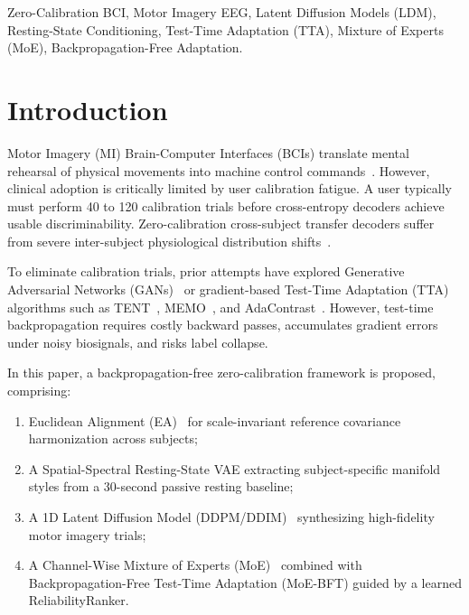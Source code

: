\documentclass[journal,10pt]{IEEEtran}
\begin{document}
\begin{IEEEkeywords}
Zero-Calibration BCI, Motor Imagery EEG, Latent Diffusion Models (LDM), Resting-State Conditioning, Test-Time Adaptation (TTA), Mixture of Experts (MoE), Backpropagation-Free Adaptation.
\end{IEEEkeywords}

\section{Introduction}
Motor Imagery (MI) Brain-Computer Interfaces (BCIs) translate mental rehearsal of physical movements into machine control commands~\cite{lotte2018review, saha2020progress}. However, clinical adoption is critically limited by user calibration fatigue. A user typically must perform 40 to 120 calibration trials before cross-entropy decoders achieve usable discriminability. Zero-calibration cross-subject transfer decoders suffer from severe inter-subject physiological distribution shifts~\cite{lawhern2018eegnet, altaheri2022physics}.

To eliminate calibration trials, prior attempts have explored Generative Adversarial Networks (GANs)~\cite{saha2020progress} or gradient-based Test-Time Adaptation (TTA) algorithms such as TENT~\cite{wang2020tent}, MEMO~\cite{zhang2022memo}, and AdaContrast~\cite{chen2022contrastive}. However, test-time backpropagation requires costly backward passes, accumulates gradient errors under noisy biosignals, and risks label collapse.

In this paper, a backpropagation-free zero-calibration framework is proposed, comprising:
\begin{enumerate}
    \item Euclidean Alignment (EA)~\cite{he2020transfer} for scale-invariant reference covariance harmonization across subjects;
    \item A Spatial-Spectral Resting-State VAE extracting subject-specific manifold styles from a 30-second passive resting baseline;
    \item A 1D Latent Diffusion Model (DDPM/DDIM)~\cite{ho2020denoising, song2020denoising, rombach2022high} synthesizing high-fidelity motor imagery trials;
    \item A Channel-Wise Mixture of Experts (MoE)~\cite{shazeer2017outrageously, fedus2022switch} combined with Backpropagation-Free Test-Time Adaptation (MoE-BFT) guided by a learned ReliabilityRanker.
\end{enumerate}
\end{document}
